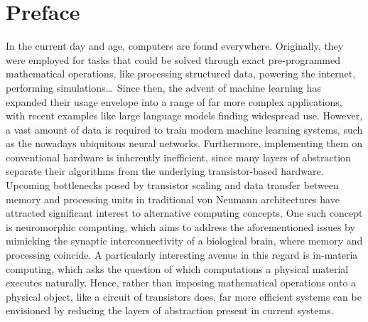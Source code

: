\chapter*{Preface}\label{sec:Preface_EN}
In the current day and age, computers are found everywhere.
Originally, they were employed for tasks that could be solved through exact pre-programmed mathematical operations, like processing structured data, powering the internet, performing simulations\dots\,
Since then, the advent of machine learning has expanded their usage envelope into a range of far more complex applications, with recent examples like large language models finding widespread use.
However, a vast amount of data is required to train modern machine learning systems, such as the nowadays ubiquitous neural networks.
Furthermore, implementing them on conventional hardware is inherently inefficient, since many layers of abstraction separate their algorithms from the underlying transistor-based hardware.
Upcoming bottlenecks posed by transistor scaling and data transfer between memory and processing units in traditional von Neumann architectures have attracted significant interest to alternative computing concepts.
One such concept is neuromorphic computing, which aims to address the aforementioned issues by mimicking the synaptic interconnectivity of a biological brain, where memory and processing coincide.
A particularly interesting avenue in this regard is in-materia computing, which asks the question of which computations a physical material executes naturally.
Hence, rather than imposing mathematical operations onto a physical object, like a circuit of transistors does, far more efficient systems can be envisioned by reducing the layers of abstraction present in current systems. \\ %


